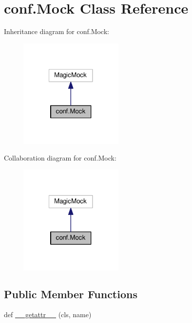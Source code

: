 \hypertarget{classconf_1_1Mock}{}\section{conf.\+Mock Class Reference}
\label{classconf_1_1Mock}


Inheritance diagram for conf.\+Mock\+:
\nopagebreak
\begin{figure}[H]
\begin{center}
\leavevmode
\includegraphics[width=146pt]{classconf_1_1Mock__inherit__graph}
\end{center}
\end{figure}


Collaboration diagram for conf.\+Mock\+:
\nopagebreak
\begin{figure}[H]
\begin{center}
\leavevmode
\includegraphics[width=146pt]{classconf_1_1Mock__coll__graph}
\end{center}
\end{figure}
\subsection*{Public Member Functions}
\begin{DoxyCompactItemize}
\item 
def \mbox{\hyperlink{classconf_1_1Mock_a9f41a215ac97faa34862615516855b30}{\+\_\+\+\_\+getattr\+\_\+\+\_\+}} (cls, name)
\end{DoxyCompactItemize}


